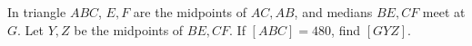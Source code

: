 In triangle $ABC$, $E,F$ are the midpoints of $AC,AB$, and medians $BE,CF$ meet at $G$. Let $Y,Z$ be the midpoints of $BE,CF$. If $[ABC]=480$, find $[GYZ]$.
